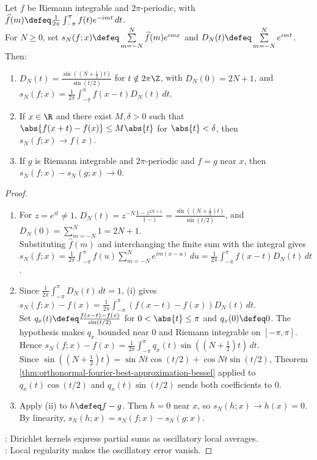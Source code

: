 \begin{theorem} \label{thm:trigonometric-fourier-dirichlet-localization} \\
Let $f$ be Riemann integrable and $2\pi$-periodic, with $\widehat{f}(m)\defeq\frac{1}{2\pi}\int_{-\pi}^{\pi}f(t)e^{-imt}\,dt$.\\
For $N\geq0$, set $s_N(f;x)\defeq\sum\limits_{m=-N}^{N}\widehat{f}(m)e^{imx}$ and $D_N(t)\defeq\sum\limits_{m=-N}^{N}e^{imt}$. Then:
\begin{enumerate}[label=(\roman*)]
\setlength{\itemsep}{0pt}
\item $D_N(t)=\frac{\sin((N+\frac12)t)}{\sin(t/2)}$ for $t\notin2\pi\Z$, with $D_N(0)=2N+1$, and $s_N(f;x)=\frac{1}{2\pi}\int_{-\pi}^{\pi}f(x-t)D_N(t)\,dt$.
\item If $x\in\R$ and there exist $M,\delta>0$ such that $\abs{f(x+t)-f(x)}\leq M\abs{t}$ for $\abs{t}<\delta$, then $s_N(f;x)\to f(x)$.
\item If $g$ is Riemann integrable and $2\pi$-periodic and $f=g$ near $x$, then $s_N(f;x)-s_N(g;x)\to0$.
\end{enumerate}
\begin{proof}
\begin{enumerate}[label=(\roman*)]
\setlength{\itemsep}{0pt}
\item For $z=e^{it}\neq1$, $D_N(t)=z^{-N}\frac{1-z^{2N+1}}{1-z}=\frac{\sin((N+\frac12)t)}{\sin(t/2)}$, and $D_N(0)=\sum\limits_{m=-N}^{N}1=2N+1$.\\
Substituting $\widehat f(m)$ and interchanging the finite sum with the integral gives\\
$s_N(f;x)=\frac{1}{2\pi}\int_{-\pi}^{\pi}f(u)\sum\limits_{m=-N}^{N}e^{im(x-u)}\,du=\frac{1}{2\pi}\int_{-\pi}^{\pi}f(x-t)D_N(t)\,dt$.
\item Since $\frac{1}{2\pi}\int_{-\pi}^{\pi}D_N(t)\,dt=1$, (i) gives $s_N(f;x)-f(x)=\frac{1}{2\pi}\int_{-\pi}^{\pi}(f(x-t)-f(x))D_N(t)\,dt$.\\
Set $q_x(t)\defeq\frac{f(x-t)-f(x)}{\sin(t/2)}$ for $0<\abs{t}\leq\pi$ and $q_x(0)\defeq0$. The hypothesis makes $q_x$ bounded near $0$ and Riemann integrable on $[-\pi,\pi]$. Hence $s_N(f;x)-f(x)=\frac{1}{2\pi}\int_{-\pi}^{\pi}q_x(t)\sin((N+\frac12)t)\,dt$.\\
Since $\sin((N+\frac12)t)=\sin Nt\cos(t/2)+\cos Nt\sin(t/2)$, Theorem \ref{thm:orthonormal-fourier-best-approximation-bessel} applied to $q_x(t)\cos(t/2)$ and $q_x(t)\sin(t/2)$ sends both coefficients to $0$.
\item Apply (ii) to $h\defeq f-g$. Then $h=0$ near $x$, so $s_N(h;x)\to h(x)=0$.\\
By linearity, $s_N(h;x)=s_N(f;x)-s_N(g;x)$.
\end{enumerate}
: Dirichlet kernels express partial sums as oscillatory local averages.\\
: Local regularity makes the oscillatory error vanish.
\end{proof}
\end{theorem}

